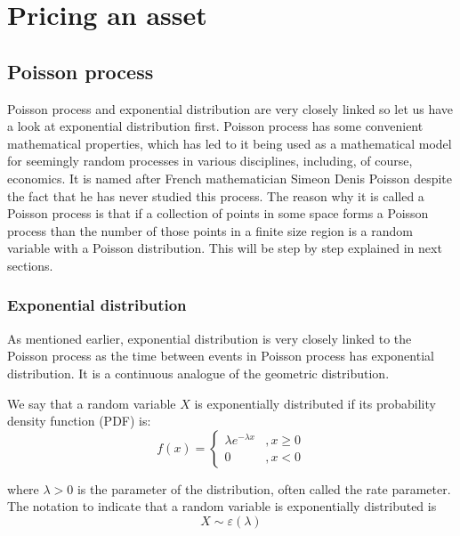 \documentclass[times, utf8, diplomski]{fer}
\begin{document}
\chapter{Pricing an asset}



	\section{Poisson process}
	Poisson process and exponential distribution are very closely linked so let us have a look at exponential distribution first. Poisson process has some convenient mathematical properties, which has led to it being used as a mathematical model for seemingly random processes in various disciplines, including, of course, economics. It is named after French mathematician Simeon Denis Poisson despite the fact that he has never studied this process. The reason why it is called a Poisson process is that if a collection of points in some space forms a Poisson process than the number of those points in a finite size region is a random variable with a Poisson distribution. This will be step by step explained in next sections.
		\subsection{Exponential distribution}
		As mentioned earlier, exponential distribution is very closely linked to the Poisson process as the time between events in Poisson process has exponential distribution. It is a continuous analogue of the geometric distribution.
			\begin{definition}
			\label{exponential}
			We say that a random variable $X$ is exponentially distributed if its probability density function (PDF) is:
			$$
				f(x) = \left\{ \begin{array}{lc} \lambda e^{-\lambda x} &, x \geq 0 \\
												0 &, x < 0 \end{array}\right.
			$$

			\noindent where $\lambda > 0$ is the parameter of the distribution, often called the rate parameter. The notation to indicate that a random variable is exponentially distributed is $$X \sim \varepsilon(\lambda)$$
			\end{definition}
\end{document}
